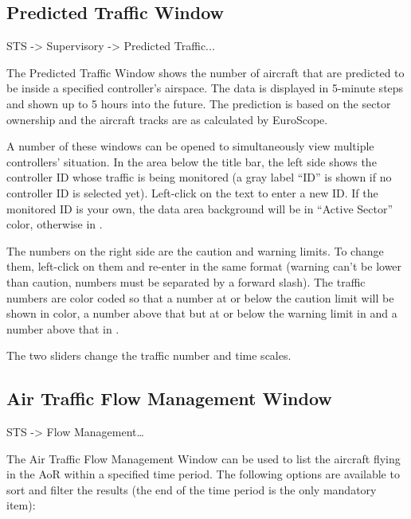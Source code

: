 \documentclass[a4paper,oneside,11pt]{memoir}
\begin{document}
\subsection{Predicted Traffic Window}
\label{win:ptw}

 STS -> Supervisory -> Predicted Traffic...

\bigskip

The Predicted Traffic Window shows the number of aircraft that are predicted to be inside a specified controller’s airspace. The data is displayed in 5-minute steps and shown up to 5 hours into the future. The prediction is based on the sector ownership and the aircraft tracks are as calculated by EuroScope.

\bigskip

A number of these windows can be opened to simultaneously view multiple controllers’ situation. In the area below the title bar, the left side shows the controller ID whose traffic is being monitored (a gray label “ID” is shown if no controller ID is selected yet). Left-click on the text to enter a new ID. If the monitored ID is your own, the data area background will be in “Active Sector” color, otherwise in .

\bigskip

The numbers on the right side are the caution and warning limits. To change them, left-click on them and re-enter in the same format (warning can’t be lower than caution, numbers must be separated by a forward slash). The traffic numbers are color coded so that a number at or below the caution limit will be shown in  color, a number above that but at or below the warning limit in  and a number above that in .

\bigskip

The two sliders change the traffic number and time scales.

\subsection{Air Traffic Flow Management Window}\label{win:atfmw}

 STS -> Flow Management…


The Air Traffic Flow Management Window can be used to list the aircraft flying in the AoR within a specified time period. The following options are available to sort and filter the results (the end of the time period is the only mandatory item):
\end{document}
